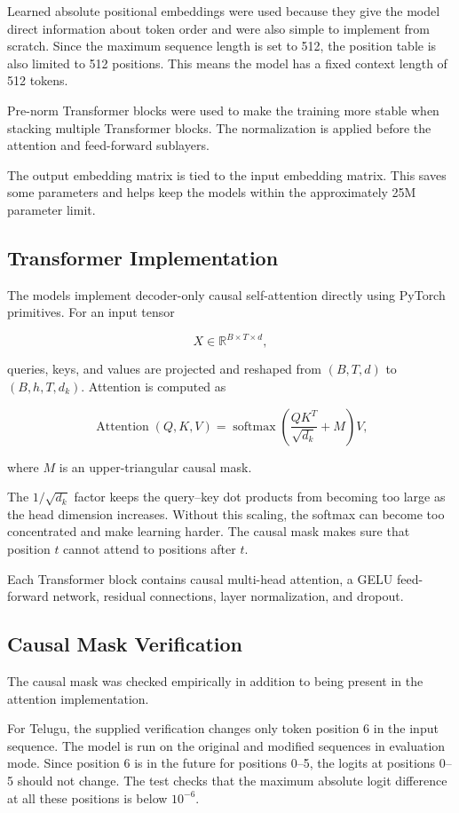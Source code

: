 \documentclass[10pt,a4paper]{article}
\begin{document}
Learned absolute positional embeddings were used because they give
the model direct information about token order and were also simple
to implement from scratch. Since the maximum sequence length is set
to 512, the position table is also limited to 512 positions. This
means the model has a fixed context length of 512 tokens.

Pre-norm Transformer blocks were used to make the training more
stable when stacking multiple Transformer blocks. The normalization
is applied before the attention and feed-forward sublayers.

The output embedding matrix is tied to the input embedding matrix.
This saves some parameters and helps keep the models within the
approximately 25M parameter limit.

\subsection{Transformer Implementation}

The models implement decoder-only causal self-attention directly
using PyTorch primitives. For an input tensor

\[
X \in \mathbb{R}^{B\times T\times d},
\]

queries, keys, and values are projected and reshaped from
$(B,T,d)$ to $(B,h,T,d_k)$. Attention is computed as

\[
\operatorname{Attention}(Q,K,V)
=
\operatorname{softmax}
\left(
\frac{QK^{T}}{\sqrt{d_k}}+M
\right)V,
\]

where $M$ is an upper-triangular causal mask.

The $1/\sqrt{d_k}$ factor keeps the query--key dot products from
becoming too large as the head dimension increases. Without this
scaling, the softmax can become too concentrated and make learning
harder. The causal mask makes sure that position $t$ cannot attend to
positions after $t$.

Each Transformer block contains causal multi-head attention, a GELU
feed-forward network, residual connections, layer normalization, and
dropout.

\subsection{Causal Mask Verification}

The causal mask was checked empirically in addition to being present
in the attention implementation.

For Telugu, the supplied verification changes only token position 6
in the input sequence. The model is run on the original and modified
sequences in evaluation mode. Since position 6 is in the future for
positions 0--5, the logits at positions 0--5 should not change. The
test checks that the maximum absolute logit difference at all these
positions is below $10^{-6}$.
\end{document}
